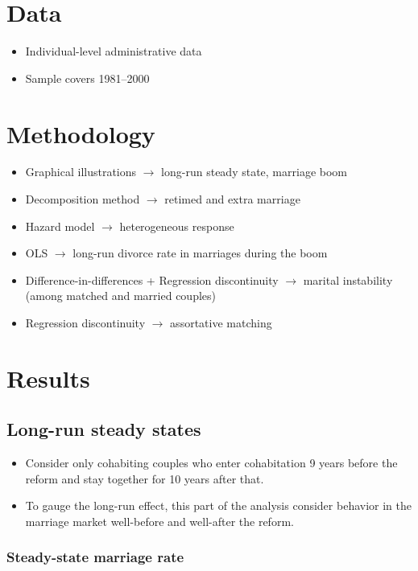 \documentclass[a4paper, 12pt]{article}
\begin{document}
\section{Data}
\begin{itemize}
\item Individual-level administrative data
\item Sample covers 1981--2000
\end{itemize}

\section{Methodology}
\begin{itemize}
\item Graphical illustrations $\rightarrow$ long-run steady state, marriage boom
\item Decomposition method $\rightarrow$ retimed and extra marriage
\item Hazard model $\rightarrow$ heterogeneous response
\item OLS $\rightarrow$ long-run divorce rate in marriages during the boom
\item Difference-in-differences + Regression discontinuity $\rightarrow$ marital instability (among matched and married couples)
\item Regression discontinuity $\rightarrow$ assortative matching
\end{itemize}

\section{Results}
\subsection{Long-run steady states}
\begin{itemize}
\item Consider only cohabiting couples who enter cohabitation 9 years before the reform and stay together for 10 years after that.
\item To gauge the long-run effect, this part of the analysis consider behavior in the marriage market well-before and well-after the reform.
\end{itemize}
\subsubsection{Steady-state marriage rate}
\end{document}
